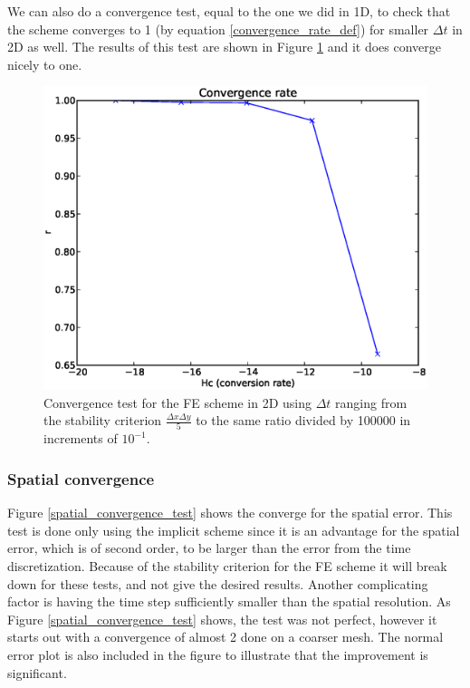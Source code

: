 We can also do a convergence test, equal to the one we did in 1D, to check that the scheme converges to 1 (by equation \eqref{convergence_rate_def}) for smaller $\Delta t$ in 2D as well. 
The results of this test are shown in Figure \ref{convergence_test_FE_2d} and it does converge nicely to one.

\begin{figure}[H]
\centering
\includegraphics[scale=0.5]{../doc/results/experiment_29112013_1709/results/ConvergenceTest.eps}
\caption[Convergence test FE 2D]{Convergence test for the FE scheme in 2D using $\Delta t$ ranging from the stability criterion $\frac{\Delta x\Delta y}{5}$ to the same ratio divided by 100000 in increments of $10^{-1}$.}
\label{convergence_test_FE_2d}
\end{figure}

\subsubsection{Spatial convergence}

Figure \ref{spatial_convergence_test} shows the converge for the spatial error. 
This test is done only using the implicit scheme since it is an advantage for the spatial error, which is of second order, to be larger than the error from the time discretization. 
Because of the stability criterion for the FE scheme it will break down for these tests, and not give the desired results. 
Another complicating factor is having the time step sufficiently smaller than the spatial resolution. 
As Figure \ref{spatial_convergence_test} shows, the test was not perfect, however it starts out with a convergence of almost 2 done on a coarser mesh. 
The normal error plot is also included in the figure to illustrate that the improvement is significant. 

